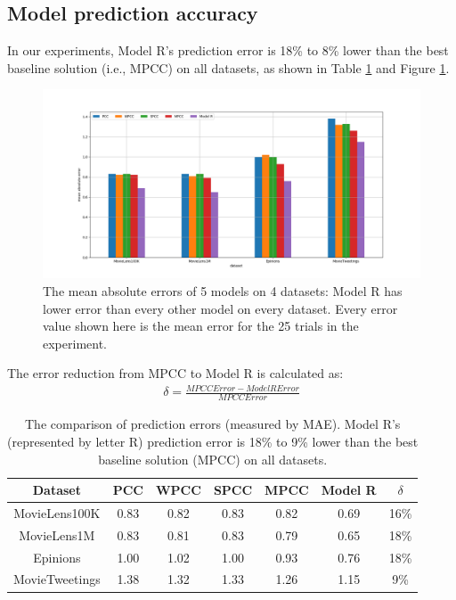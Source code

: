 \documentclass[12pt]{WSUThesis}
\theoremstyle{definition}
\begin{document}
\subsection{Model prediction accuracy}
In our experiments, Model R's prediction error is 18\% to 8\% lower than
the best baseline solution (i.e., MPCC) on all datasets, as shown in Table 
\ref{tab:rating-errors} and Figure \ref{fig:rating-errors}.
\begin{figure}[!ht]\centering
	\includegraphics[width=1\textwidth]{rating-errors}
	\caption{
		The mean absolute errors of 5 models on 4 datasets:
		Model R has lower error than every other model on every dataset.
		Every error value shown here is the mean error for the 25 trials in the experiment.
	}
	\label{fig:rating-errors}
\end{figure}
The error reduction from MPCC to Model R is calculated as:
\begin{align*}
\delta = \frac{MPCCError - ModelRError}{MPCCError}
\end{align*}
\begin{table}[!htb]
	\centering
	\caption{
		The comparison of prediction errors (measured by MAE).
		Model R's (represented by letter R) prediction error is 18\% to 9\% 
		lower than the best baseline 
		solution (MPCC) on all datasets.
	}
	\begin{tabular}{ccccccc} \hline
		Dataset & PCC & WPCC & SPCC & MPCC & Model R & $ \delta $ \\ \hline
		MovieLens100K & 0.83 & 0.82 & 0.83 & 0.82 & 0.69 & 16\% \\ \hline
		MovieLens1M & 0.83 & 0.81 & 0.83 & 0.79 & 0.65 & 18\% \\ \hline
		Epinions & 1.00 & 1.02 & 1.00 & 0.93 & 0.76 & 18\% \\ \hline
		MovieTweetings & 1.38 & 1.32 & 1.33 & 1.26 & 1.15 & 9\%  \\ \hline
	\end{tabular}
	\label{tab:rating-errors}
\end{table}
\end{document}
